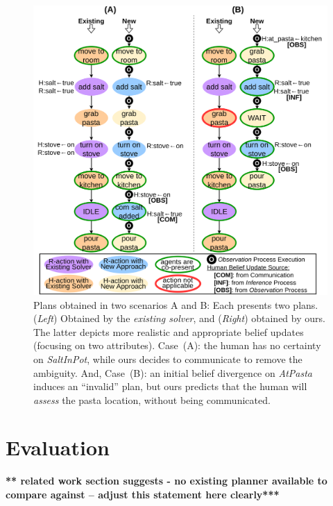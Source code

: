 \documentclass[letterpaper]{article} %
\begin{document}
\begin{figure}[t!]
    \centering
    \includegraphics[width=0.99\linewidth]{figures/qualitative_plans.png}
    \caption{
    Plans obtained in two scenarios A and B: Each presents two plans. (\textit{Left}) Obtained by the \textit{existing solver}, and (\textit{Right}) obtained by ours. The latter depicts more realistic and appropriate belief updates (focusing on two attributes).
    Case~(A): the human has no certainty on {\em SaltInPot}, while ours decides to communicate to remove the ambiguity. 
    And, Case~(B): an initial belief divergence on {\em AtPasta} induces an ``invalid'' plan, but ours predicts that the human will \textit{assess} the pasta location, without being communicated.
    }
    \label{fig:scenarios}
\end{figure}

    

\section{Evaluation}
\textbf{** related work section suggests - no existing planner available to compare against -- adjust this statement here clearly***}
\end{document}
